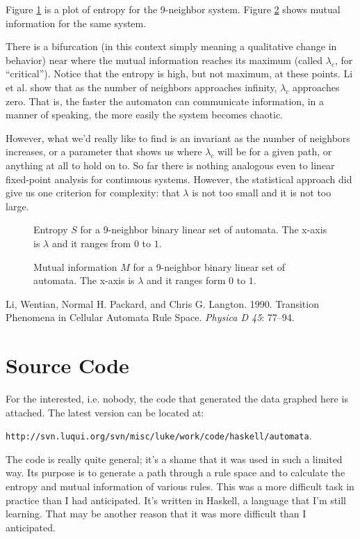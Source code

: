 \documentclass[12pt]{article}
\begin{document}
Figure \ref{entropy-9} is a plot of entropy for the 9-neighbor system.
Figure \ref{mutual-9} shows mutual information for the same system.

There is a bifurcation (in this context simply meaning a qualitative
change in behavior) near where the mutual information reaches its
maximum (called $\lambda_c$, for ``critical'').  Notice that the entropy
is high, but not maximum, at these points.  Li et al. show that as the
number of neighbors approaches infinity, $\lambda_c$ approaches zero.
That is, the faster the automaton can communicate information, in a
manner of speaking, the more easily the system becomes chaotic.

However, what we'd really like to find is an invariant as the number of
neighbors increases, or a parameter that shows us where $\lambda_c$ will
be for a given path, or anything at all to hold on to.  So far there is
nothing analogous even to linear fixed-point analysis for continuous
systems.  However, the statistical approach did give us one criterion
for complexity: that $\lambda$ is not too small and it is not too large.

\begin{figure}
\caption{Entropy $S$ for a 9-neighbor binary linear set of automata.  The
x-axis is $\lambda$ and it ranges from $0$ to $1$.}
\label{entropy-9}
\end{figure}

\begin{figure}
\caption{Mutual information $M$ for a 9-neighbor binary linear set of
automata.  The x-axis is $\lambda$ and it ranges form $0$ to $1$.}
\label{mutual-9}
\end{figure}

\begin{thebibliography}{4in}
 Li, Wentian, Normal H. Packard, and Chris G. Langton.
1990.  Transition Phenomena in Cellular Automata Rule Space.
\textit{Physica D 45}: 77--94.
\end{thebibliography}

\section{Source Code}

For the interested, i.e. nobody, the code that generated the data
graphed here is attached.  The latest version can be located at:

\noindent \texttt{http://svn.luqui.org/svn/misc/luke/work/code/haskell/automata}.

The code is really quite general; it's a shame that it was used in such
a limited way.  Its purpose is to generate a path through a rule space
and to calculate the entropy and mutual information of various rules.
This was a more difficult task in practice than I had anticipated. It's
written in Haskell, a language that I'm still learning.  That may be
another reason that it was more difficult than I anticipated. 
\end{document}

